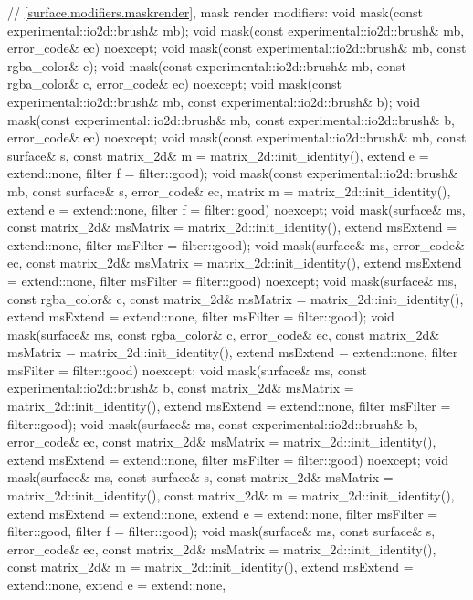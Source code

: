 \begin{codeblock}
{{{{{    // \ref{surface.modifiers.maskrender}, mask render modifiers:
    void mask(const experimental::io2d::brush& mb);
    void mask(const experimental::io2d::brush& mb, error_code& ec)
      noexcept;
    void mask(const experimental::io2d::brush& mb, const rgba_color& c);
    void mask(const experimental::io2d::brush& mb, const rgba_color& c, 
      error_code& ec) noexcept;
    void mask(const experimental::io2d::brush& mb,
      const experimental::io2d::brush& b);
    void mask(const experimental::io2d::brush& mb,
      const experimental::io2d::brush& b, error_code& ec) noexcept;
    void mask(const experimental::io2d::brush& mb, const surface& s,
      const matrix_2d& m = matrix_2d::init_identity(), extend e = extend::none, 
      filter f = filter::good);
    void mask(const experimental::io2d::brush& mb, const surface& s,
      error_code& ec, matrix m = matrix_2d::init_identity(),
      extend e = extend::none, filter f = filter::good) noexcept;
    void mask(surface& ms,
      const matrix_2d& msMatrix = matrix_2d::init_identity(),
      extend msExtend = extend::none, filter msFilter = filter::good);
    void mask(surface& ms, error_code& ec, 
      const matrix_2d& msMatrix = matrix_2d::init_identity(),
      extend msExtend = extend::none, filter msFilter = filter::good) noexcept;
    void mask(surface& ms, const rgba_color& c,
      const matrix_2d& msMatrix = matrix_2d::init_identity(),
      extend msExtend = extend::none, filter msFilter = filter::good);
    void mask(surface& ms, const rgba_color& c, error_code& ec, 
      const matrix_2d& msMatrix = matrix_2d::init_identity(),
      extend msExtend = extend::none, filter msFilter = filter::good) noexcept;
    void mask(surface& ms, const experimental::io2d::brush& b, 
      const matrix_2d& msMatrix = matrix_2d::init_identity(),
      extend msExtend = extend::none, filter msFilter = filter::good);
    void mask(surface& ms, const experimental::io2d::brush& b, error_code& ec,
      const matrix_2d& msMatrix = matrix_2d::init_identity(),
      extend msExtend = extend::none, filter msFilter = filter::good) noexcept;
    void mask(surface& ms, const surface& s,
      const matrix_2d& msMatrix = matrix_2d::init_identity(),
      const matrix_2d& m = matrix_2d::init_identity(),
      extend msExtend = extend::none, extend e = extend::none,
      filter msFilter = filter::good, filter f = filter::good);
    void mask(surface& ms, const surface& s, error_code& ec,
      const matrix_2d& msMatrix = matrix_2d::init_identity(),
      const matrix_2d& m = matrix_2d::init_identity(),
      extend msExtend = extend::none, extend e = extend::none,
}}}}}
\end{codeblock}
